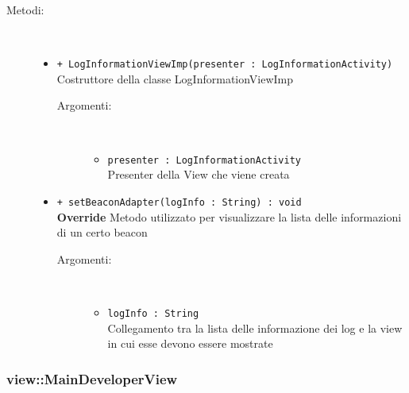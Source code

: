 \documentclass[../DefinizioneDiProdotto.tex]{subfiles}
\begin{document}
\begin{description}
\begin{itemize}
\end{itemize}
\item[Metodi:] \
\begin{itemize}
\item \texttt{+ LogInformationViewImp(presenter : LogInformationActivity)}\\
Costruttore della classe LogInformationViewImp
 \begin{description}
\item[Argomenti:] \
\begin{itemize}
\item \texttt{presenter : LogInformationActivity}\\
Presenter della View che viene creata\end{itemize}
\end{description}
\item \texttt{+ setBeaconAdapter(logInfo : String) : void}\\
\textbf{Override} Metodo utilizzato per visualizzare la lista delle informazioni di un certo beacon
 \begin{description}
\item[Argomenti:] \
\begin{itemize}
\item \texttt{logInfo : String}\\
Collegamento tra la lista delle informazione dei log e la view in cui esse devono essere mostrate\end{itemize}
\end{description}
\end{itemize}
\end{description}

\subsubsection{view::MainDeveloperView}
\end{document}
